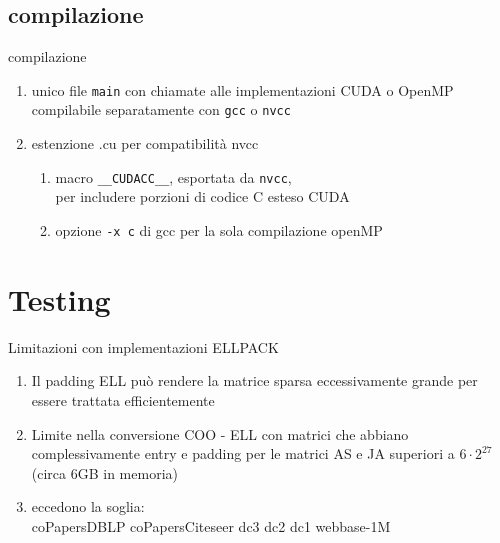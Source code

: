 \documentclass[aspectratio=1610]{beamer}
\newcommand{\vvv}[1]{{\small\texttt{#1}}}
\begin{document}
\subsection{compilazione}
\begin{frame}{compilazione}
	\begin{enumerate}
		\item	unico file \vvv{main} con chiamate alle implementazioni CUDA o OpenMP\\
					compilabile separatamente con \vvv{gcc} o \vvv{nvcc} 
		\item	estenzione .cu per compatibilità nvcc
		\pause	
		\begin{enumerate}
			\item	macro \vvv{\_\_CUDACC\_\_}, esportata da \vvv{nvcc}, \\
				per includere porzioni di codice C esteso CUDA
			\item	opzione \vvv{-x c} di gcc per la sola compilazione openMP
		\end{enumerate}
	\end{enumerate}
\end{frame}

\section{Testing}

\begin{frame} {Limitazioni con implementazioni ELLPACK}
	\begin{enumerate}
		\item	Il padding ELL può rendere la matrice sparsa eccessivamente grande 	
				per essere trattata efficientemente
		\item	Limite nella conversione COO - ELL con matrici che abbiano complessivamente 
				entry e padding per le matrici AS e JA superiori a $6 \cdot 2^{27}$
				(circa 6GB in memoria)
		\item	eccedono la soglia:\\coPapersDBLP	coPapersCiteseer	dc3	dc2	dc1	webbase-1M
	\end{enumerate}
\end{frame}
\end{document}
